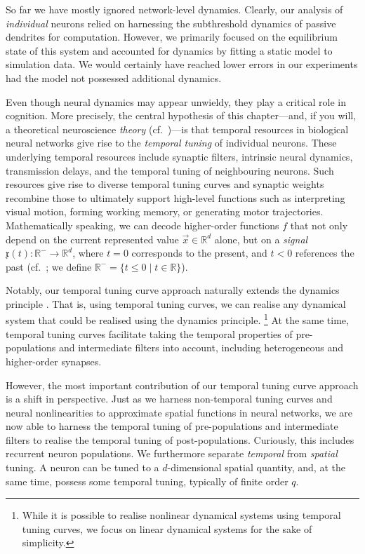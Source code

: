 
So far we have mostly ignored network-level dynamics.
Clearly, our analysis of \emph{individual} \nlif neurons relied on harnessing the subthreshold dynamics of passive dendrites for computation.
However, we primarily focused on the equilibrium state of this system and accounted for dynamics by fitting a static model to simulation data.
We would certainly have reached lower errors in our experiments had the model not possessed additional dynamics.

Even though neural dynamics may appear unwieldy, they play a critical role in cognition.
More precisely, the central hypothesis of this chapter---and, if you will, a theoretical neuroscience \emph{theory} (cf.~)---is that temporal resources in biological neural networks give rise to the \emph{temporal tuning} of individual neurons.
These underlying temporal resources include synaptic filters, intrinsic neural dynamics, transmission delays, and the temporal tuning of neighbouring neurons.
Such resources give rise to diverse temporal tuning curves and synaptic weights recombine those to ultimately support high-level functions such as interpreting visual motion, forming working memory, or generating motor trajectories.
Mathematically speaking, we can decode higher-order functions $f$ that not only depend on the current represented value $\vec x \in \mathbb{R}^d$ alone, but on a \emph{signal} $\mathfrak{x}(t) : \mathbb{R}^- \longrightarrow \mathbb{R}^d$, where $t = 0$ corresponds to the present, and $t < 0$ references the past (cf.~; we define $\mathbb{R}^- = \{ t \leq 0 \mid t \in \mathbb{R} \}$).

Notably, our temporal tuning curve approach naturally extends the \NEF dynamics principle \citep[Chapter~8]{eliasmith2003neural}.
That is, using temporal tuning curves, we can realise any dynamical system that could be realised using the dynamics principle.%
\footnote{While it is possible to realise nonlinear dynamical systems using temporal tuning curves, we focus on linear dynamical systems for the sake of simplicity.}
At the same time, temporal tuning curves facilitate taking the temporal properties of pre-populations and intermediate filters into account, including heterogeneous and higher-order synapses.

However, the most important contribution of our temporal tuning curve approach is a shift in perspective.
Just as we harness non-temporal tuning curves and neural nonlinearities to approximate spatial functions in neural networks, we are now able to harness the temporal tuning of pre-populations and intermediate filters to realise the temporal tuning of post-populations.
Curiously, this includes recurrent neuron populations.
We furthermore separate \emph{temporal} from \emph{spatial} tuning.
A neuron can be tuned to a $d$-dimensional spatial quantity, and, at the same time, possess some temporal tuning, typically of finite order $q$.

